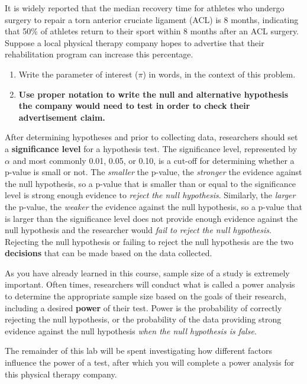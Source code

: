 \documentclass[
]{report}
\begin{document}
It is widely reported that the median recovery time for athletes who undergo surgery to repair a torn anterior cruciate ligament (ACL) is 8 months, indicating that 50\% of athletes return to their sport within 8 months after an ACL surgery. Suppose a local physical therapy company hopes to advertise that their rehabilitation program can increase this percentage.

\begin{enumerate}
\def\labelenumi{\arabic{enumi}.}
\item
  Write the parameter of interest (\(\pi\)) in words, in the context of this problem.
  \vspace{0.5in}
\item
  \textbf{Use proper notation to write the null and alternative hypothesis the company would need to test in order to check their advertisement claim.}
  \vspace{0.5in}
\end{enumerate}

After determining hypotheses and prior to collecting data, researchers should set a \textbf{significance level} for a hypothesis test. The significance level, represented by \(\alpha\) and most commonly 0.01, 0.05, or 0.10, is a cut-off for determining whether a p-value is small or not. The \emph{smaller} the p-value, the \emph{stronger} the evidence against the null hypothesis, so a p-value that is smaller than or equal to the significance level is strong enough evidence to \emph{reject the null hypothesis}. Similarly, the \emph{larger} the p-value, the \emph{weaker} the evidence against the null hypothesis, so a p-value that is larger than the significance level does not provide enough evidence against the null hypothesis and the researcher would \emph{fail to reject the null hypothesis}. Rejecting the null hypothesis or failing to reject the null hypothesis are the two \textbf{decisions} that can be made based on the data collected.

As you have already learned in this course, sample size of a study is extremely important. Often times, researchers will conduct what is called a power analysis to determine the appropriate sample size based on the goals of their research, including a desired \textbf{power} of their test. Power is the probability of correctly rejecting the null hypothesis, or the probability of the data providing strong evidence against the null hypothesis \emph{when the null hypothesis is false}.

The remainder of this lab will be spent investigating how different factors influence the power of a test, after which you will complete a power analysis for this physical therapy company.
\end{document}
